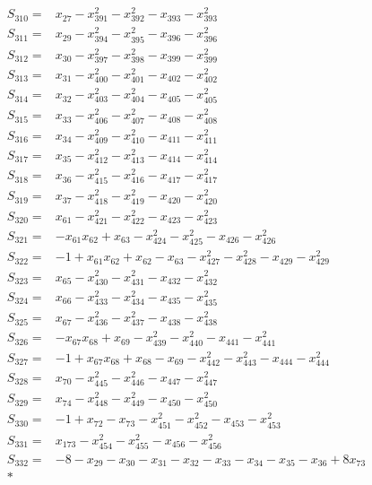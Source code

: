 \begin{align*}
S_{310}={}&x_{27}-x_{391}^{2}-x_{392}^{2}-x_{393}-x_{393}^{2}\\[3pt]
S_{311}={}&x_{29}-x_{394}^{2}-x_{395}^{2}-x_{396}-x_{396}^{2}\\[3pt]
S_{312}={}&x_{30}-x_{397}^{2}-x_{398}^{2}-x_{399}-x_{399}^{2}\\[3pt]
S_{313}={}&x_{31}-x_{400}^{2}-x_{401}^{2}-x_{402}-x_{402}^{2}\\[3pt]
S_{314}={}&x_{32}-x_{403}^{2}-x_{404}^{2}-x_{405}-x_{405}^{2}\\[3pt]
S_{315}={}&x_{33}-x_{406}^{2}-x_{407}^{2}-x_{408}-x_{408}^{2}\\[3pt]
S_{316}={}&x_{34}-x_{409}^{2}-x_{410}^{2}-x_{411}-x_{411}^{2}\\[3pt]
S_{317}={}&x_{35}-x_{412}^{2}-x_{413}^{2}-x_{414}-x_{414}^{2}\\[3pt]
S_{318}={}&x_{36}-x_{415}^{2}-x_{416}^{2}-x_{417}-x_{417}^{2}\\[3pt]
S_{319}={}&x_{37}-x_{418}^{2}-x_{419}^{2}-x_{420}-x_{420}^{2}\\[3pt]
S_{320}={}&x_{61}-x_{421}^{2}-x_{422}^{2}-x_{423}-x_{423}^{2}\\[3pt]
S_{321}={}&-x_{61}x_{62}+x_{63}-x_{424}^{2}-x_{425}^{2}-x_{426}-x_{426}^{2}\\[3pt]
S_{322}={}&-1+x_{61}x_{62}+x_{62}-x_{63}-x_{427}^{2}-x_{428}^{2}-x_{429}-x_{429}^{2}\\[3pt]
S_{323}={}&x_{65}-x_{430}^{2}-x_{431}^{2}-x_{432}-x_{432}^{2}\\[3pt]
S_{324}={}&x_{66}-x_{433}^{2}-x_{434}^{2}-x_{435}-x_{435}^{2}\\[3pt]
S_{325}={}&x_{67}-x_{436}^{2}-x_{437}^{2}-x_{438}-x_{438}^{2}\\[3pt]
S_{326}={}&-x_{67}x_{68}+x_{69}-x_{439}^{2}-x_{440}^{2}-x_{441}-x_{441}^{2}\\[3pt]
S_{327}={}&-1+x_{67}x_{68}+x_{68}-x_{69}-x_{442}^{2}-x_{443}^{2}-x_{444}-x_{444}^{2}\\[3pt]
S_{328}={}&x_{70}-x_{445}^{2}-x_{446}^{2}-x_{447}-x_{447}^{2}\\[3pt]
S_{329}={}&x_{74}-x_{448}^{2}-x_{449}^{2}-x_{450}-x_{450}^{2}\\[3pt]
S_{330}={}&-1+x_{72}-x_{73}-x_{451}^{2}-x_{452}^{2}-x_{453}-x_{453}^{2}\\[3pt]
S_{331}={}&x_{173}-x_{454}^{2}-x_{455}^{2}-x_{456}-x_{456}^{2}\\[3pt]
S_{332}={}&-8-x_{29}-x_{30}-x_{31}-x_{32}-x_{33}-x_{34}-x_{35}-x_{36}+8x_{73}\\*

\end{align*}
